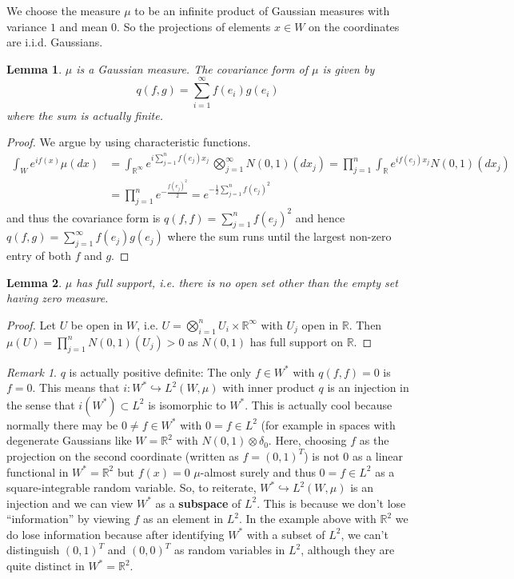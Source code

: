 \documentclass{scrartcl}
\newtheorem{lemma}{Lemma}
\theoremstyle{definition}
\theoremstyle{remark}
\newtheorem{remark}{Remark}
\newcommand{\R}{\mathbb R}
\begin{document}
We choose the measure $\mu$ to be an infinite product of Gaussian measures with variance $1$ and mean $0$. So the projections of elements $x\in W$ on the coordinates are i.i.d. Gaussians.
\begin{lemma}\label{lem:Gaussian}
$\mu$ is a Gaussian measure. The covariance form of $\mu$ is given by
\[ q(f,g) = \sum_{i=1}^\infty f(e_i)g(e_i) \]
where the sum is actually finite.
\end{lemma}
\begin{proof}
We argue by using characteristic functions. 
\begin{align*}
\int_W e^{if(x)}\mu(dx) &= \int_{\R^\infty} e^{i\sum_{j=1}^n f(e_j) x_j}\, \bigotimes_{j=1}^\infty N(0,1)(dx_j) = \prod_{j=1}^n \int_\R e^{if(e_j)x_j}N(0,1)(dx_j)\\
&= \prod_{j=1}^n e^{-\frac{f(e_j)^2}{2}} = e^{-\frac{1}{2}\sum_{j=1}^n f(e_j)^2}
\end{align*}
and thus the covariance form is $q(f, f) = \sum_{j=1}^n f(e_j)^2$ and hence $q(f,g)=\sum_{j=1}^\infty f(e_j)g(e_j)$ where the sum runs until the largest non-zero entry of both $f$ and $g$.
\end{proof}
\begin{lemma}
$\mu$ has full support, i.e. there is no open set other than the empty set having zero measure.
\end{lemma}
\begin{proof}
Let $U$ be open in $W$, i.e. $U = \bigotimes_{i=1}^n U_i \times \R^\infty$ with $U_j$ open in $\R$. Then $\mu(U) = \prod_{j=1}^n N(0,1)(U_j) > 0$ as $N(0,1)$ has full support on $\R$.
\end{proof}
\begin{remark}
$q$ is actually positive definite: The only $f\in W^*$ with $q(f, f) = 0$ is $f = 0$. This means that $i: W^*\hookrightarrow L^2(W, \mu)$ with inner product $q$ is an injection in the sense that $i(W^*) \subset L^2$ is isomorphic to $W^*$. This is actually cool because normally there may be $0 \neq f \in W^*$ with $0 = f \in L^2$ (for example in spaces with degenerate Gaussians like $W= \R^2$ with $N(0,1) \otimes \delta_0$. Here, choosing $f$ as the projection on the second coordinate (written as $f = (0,1)^T$) is not $0$ as a linear functional in $W^* = \R^2$ but $f(x) = 0$ $\mu$-almost surely and thus $0 = f\in L^2$ as a square-integrable random variable.
So, to reiterate, $W^*\hookrightarrow L^2(W, \mu)$ is an injection and we can view $W^*$ as a \textbf{subspace} of $L^2$. This is because we don't lose ``information'' by viewing $f$ as an element in $L^2$. In the example above with $\R^2$ we do lose information because after identifying $W^*$ with a subset of $L^2$, we can't distinguish $(0,1)^T$ and $(0,0)^T$ as random variables in $L^2$, although they are quite distinct in $W^* = \R^2$.
\end{remark}
\end{document}
